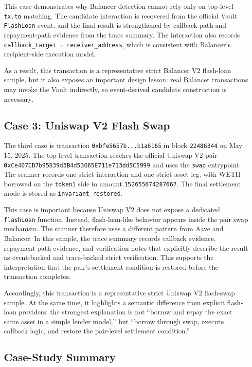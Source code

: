 This case demonstrates why Balancer detection cannot rely only on top-level \texttt{tx.to} matching. The candidate interaction is recovered from the official Vault \texttt{FlashLoan} event, and the final result is strengthened by callback-path and repayment-path evidence from the trace summary. The interaction also records \texttt{callback\_target = receiver\_address}, which is consistent with Balancer's recipient-side execution model.

As a result, this transaction is a representative strict Balancer V2 flash-loan sample, but it also exposes an important design lesson: real Balancer transactions may invoke the Vault indirectly, so event-derived candidate construction is necessary.

\subsection{Case 3: Uniswap V2 Flash Swap}

The third case is transaction \texttt{0xbfe5657b...b1a6165} in block \texttt{22486344} on May 15, 2025. The top-level transaction reaches the official Uniswap V2 pair \texttt{0xCe407CD7b95B39d3B4d53065E711e713dd5C5999} and uses the \texttt{swap} entrypoint. The scanner records one strict interaction and one strict asset leg, with WETH borrowed on the \texttt{token1} side in amount \texttt{152655674287667}. The final settlement mode is stored as \texttt{invariant\_restored}.

This case is important because Uniswap V2 does not expose a dedicated \texttt{flashLoan} function. Instead, flash-loan-like behavior appears inside the pair swap mechanism. The scanner therefore uses a different pattern from Aave and Balancer. In this sample, the trace summary records callback evidence, repayment-path evidence, and verification notes that explicitly describe the result as event-backed and trace-backed strict verification. This supports the interpretation that the pair's settlement condition is restored before the transaction completes.

Accordingly, this transaction is a representative strict Uniswap V2 flash-swap sample. At the same time, it highlights a semantic difference from explicit flash-loan providers: the strongest explanation is not ``borrow and repay the exact same asset in a simple lender model,'' but ``borrow through swap, execute callback logic, and restore the pair-level settlement condition.''

\subsection{Case-Study Summary}

